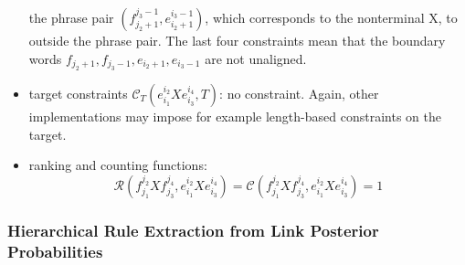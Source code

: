 \begin{itemize}
the phrase pair $(f_{j_2 + 1}^{j_3 - 1}, e_{i_2 + 1}^{i_3 - 1})$, which
corresponds to the nonterminal X, to outside the phrase pair.
The last four constraints
mean that the boundary words
$f_{j_2 + 1}, f_{j_3 - 1}, e_{i_2 + 1}, e_{i_3 - 1}$ are not unaligned.
  \item target constraints $\mathcal{C}_T(e_{i_1}^{i_2} X e_{i_3}^{i_4}, T)$: no
constraint. Again, other implementations may impose for example length-based
constraints on the target.
  \item ranking and counting functions:
%
\begin{equation}
  \mathcal{R}(f_{j_1}^{j_2} X f_{j_3}^{j_4}, e_{i_1}^{i_2} X e_{i_3}^{i_4}) = \mathcal{C}(f_{j_1}^{j_2} X f_{j_3}^{j_4}, e_{i_1}^{i_2} X e_{i_3}^{i_4}) = 1
\end{equation}
\end{itemize}
%

\subsubsection{Hierarchical Rule Extraction from Link Posterior Probabilities}

